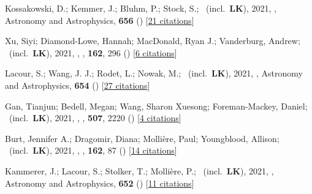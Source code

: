\item[{\color{numcolor}\scriptsize61}] Kossakowski, D.; Kemmer, J.; Bluhm, P.; Stock, S.; \etal\ (incl.\ \textbf{LK}), 2021, , Astronomy and Astrophysics, \textbf{656} () [\href{https://ui.adsabs.harvard.edu/abs/2021A&A...656A.124K}{21 citations}]

\item[{\color{numcolor}\scriptsize60}] Xu, Siyi; Diamond-Lowe, Hannah; MacDonald, Ryan J.; Vanderburg, Andrew; \etal\ (incl.\ \textbf{LK}), 2021, , \aj, \textbf{162}, 296 () [\href{https://ui.adsabs.harvard.edu/abs/2021AJ....162..296X}{6 citations}]

\item[{\color{numcolor}\scriptsize59}] Lacour, S.; Wang, J. J.; Rodet, L.; Nowak, M.; \etal\ (incl.\ \textbf{LK}), 2021, , Astronomy and Astrophysics, \textbf{654} () [\href{https://ui.adsabs.harvard.edu/abs/2021A&A...654L...2L}{27 citations}]

\item[{\color{numcolor}\scriptsize58}] Gan, Tianjun; Bedell, Megan; Wang, Sharon Xuesong; Foreman-Mackey, Daniel; \etal\ (incl.\ \textbf{LK}), 2021, , \mnras, \textbf{507}, 2220 () [\href{https://ui.adsabs.harvard.edu/abs/2021MNRAS.507.2220G}{4 citations}]

\item[{\color{numcolor}\scriptsize57}] Burt, Jennifer A.; Dragomir, Diana; Molli{\`e}re, Paul; Youngblood, Allison; \etal\ (incl.\ \textbf{LK}), 2021, , \aj, \textbf{162}, 87 () [\href{https://ui.adsabs.harvard.edu/abs/2021AJ....162...87B}{14 citations}]

\item[{\color{numcolor}\scriptsize56}] Kammerer, J.; Lacour, S.; Stolker, T.; Molli{\`e}re, P.; \etal\ (incl.\ \textbf{LK}), 2021, , Astronomy and Astrophysics, \textbf{652} () [\href{https://ui.adsabs.harvard.edu/abs/2021A&A...652A..57K}{11 citations}]

